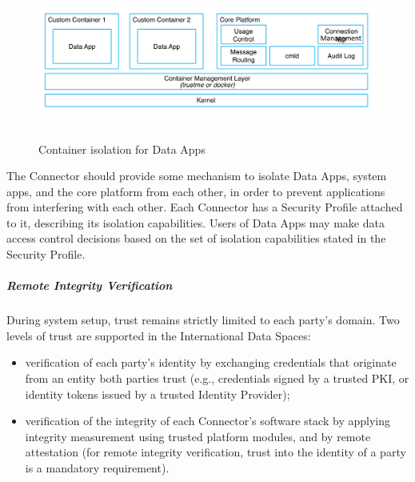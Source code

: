 
\begin{figure}[H]
	\begin{Center}
		\includegraphics[width=6.4in,height=2.02in]{./media/image66.png}
		\caption{Container isolation for Data Apps}
		\label{fig:Container_isolation_for_Data_Apps}
	\end{Center}
\end{figure}




The Connector should provide some mechanism to isolate Data Apps, system apps, and the core platform from each other, in order to prevent applications from interfering with each other. Each Connector has a Security Profile attached to it, describing its isolation capabilities. Users of Data Apps may make data access control decisions based on the set of isolation capabilities stated in the Security Profile.

\subparagraph*{Remote Integrity Verification \\}
During system setup, trust remains strictly limited to each party's domain. Two levels of trust are supported in the International Data Spaces:

\begin{itemize}
	\item verification of each party’s identity by exchanging credentials that originate from an entity both parties trust (e.g., credentials signed by a trusted PKI, or identity tokens issued by a trusted Identity Provider);

	\item verification of the integrity of each Connector’s software stack by applying integrity measurement using trusted platform modules, and by remote attestation (for remote integrity verification, trust into the identity of a party is a mandatory requirement).
\end{itemize}

